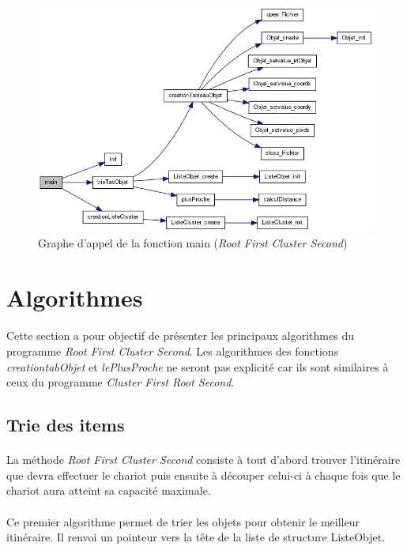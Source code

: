 \documentclass[twoside,UTF8]{EPURapport}
\begin{document}
\begin{figure}[H]
\center
\includegraphics[scale=0.5]{images/main_appelRF.png}
\caption{Graphe d'appel de la fonction main (\textit{Root First Cluster Second})}
\end{figure} 


\section{Algorithmes}

\paragraph{}
Cette section a pour objectif de présenter les principaux algorithmes du programme \textit{Root First Cluster Second}. Les algorithmes des fonctions \textit{creationtabObjet} et \textit{lePlusProche} ne seront pas explicité car ils sont similaires à ceux du programme \textit{Cluster First Root Second}.

\subsection{Trie des items}

\paragraph{}
La méthode \textit{Root First Cluster Second} consiste à tout d'abord trouver l'itinéraire que devra effectuer le chariot puis ensuite à découper celui-ci à chaque fois que le chariot aura atteint sa capacité maximale. 

\paragraph{}
Ce premier algorithme permet de trier les objets pour obtenir le meilleur itinéraire. Il renvoi un pointeur vers la tête de la liste de structure ListeObjet. 
\end{document}
